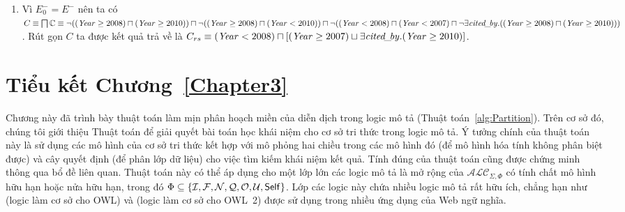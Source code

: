 \begin{Example}
\begin{enumerate}
		\item Vì $E^-_0 = E^-$ nên ta có $C \equiv \bigsqcap\mathbb{C} \equiv \neg((\mathit{Year} \geq 2008) \sqcap (\mathit{Year} \geq 2010)) \sqcap \neg((\mathit{Year} \geq 2008) \sqcap (\mathit{Year} < 2010)) \sqcap \neg((\mathit{Year} < 2008) \sqcap (\mathit{Year} < 2007) \sqcap \neg\exists\mathit{cited\!\_\!by}.((\mathit{Year} \geq 2008) \sqcap (\mathit{Year} \geq 2010)))$. Rút gọn $C$ ta được kết quả trả về là $C_{rs} \equiv (\mathit{Year} < 2008) \sqcap [(\mathit{Year} \geq 2007) \sqcup \exists\mathit{cited\!\_\!by}.(\mathit{Year} \geq 2010)]$.\myend
	\end{enumerate}
\end{Example}

\section*{Tiểu kết Chương~\ref{Chapter3}}
\label{sec:Chap3.Summary}
Chương này đã trình bày thuật toán làm mịn phân hoạch miền của diễn dịch trong logic mô tả (Thuật toán~\ref{alg:Partition}). Trên cơ sở đó, chúng tôi giới thiệu Thuật toán \BBCLearnS để giải quyết bài toán học khái niệm cho cơ sở tri thức trong logic mô tả. 
Ý tưởng chính của thuật toán này là sử dụng các mô hình của cơ sở tri thức kết hợp với mô phỏng hai chiều trong các mô hình đó (để mô hình hóa tính không phân biệt được) và cây quyết định (để phân lớp dữ liệu) cho việc tìm kiếm khái niệm kết quả. Tính đúng của thuật toán \BBCLearnS cũng được chứng minh thông qua bổ đề liên quan.
Thuật toán này có thể áp dụng cho một lớp lớn các logic mô tả là mở rộng của $\mathcal{ALC}_{\Sigma,\Phi}$ có tính chất mô hình hữu hạn hoặc nửa hữu hạn, trong đó $\Phi \subseteq \{\mathcal{I}, \mathcal{F}, \mathcal{N}, \mathcal{Q}, \mathcal{O}, \mathcal{U}, \mathsf{Self}\}$. Lớp các logic này chứa nhiều logic mô tả rất hữu ích, chẳng hạn như \SHIQ (logic làm cơ sở cho OWL) và \SROIQ (logic làm cơ sở cho OWL~2) được sử dụng trong nhiều ứng dụng của Web ngữ nghĩa.
\cleardoublepage
